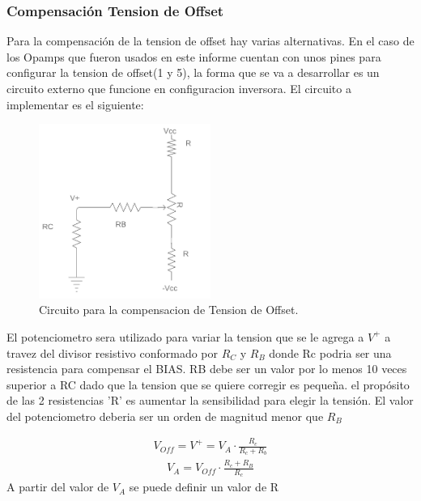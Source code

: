 \subsubsection{Compensación Tension de Offset}
Para la compensación de la tension de offset hay varias alternativas. En el caso de los Opamps que fueron usados en este informe cuentan con unos pines para configurar la tension de offset(1 y 5), la forma que se va a desarrollar es un circuito externo que funcione en configuracion inversora.
El circuito a implementar es el siguiente:
\begin{figure}[H]	
	\centering
	\includegraphics[width=0.5\textwidth]{imagenes/CompensacionOff.PNG}
	\caption{Circuito para la compensacion de Tension de Offset.}
	\label{fig:CompensacionOff}
\end{figure}
El potenciometro sera utilizado para variar la tension que se le agrega a $V^+$ a travez del divisor resistivo conformado por $R_C$ y $R_B$ donde Rc podria ser una resistencia para compensar el BIAS. RB debe ser un valor por lo menos 10 veces superior a RC dado que la tension que se quiere corregir es pequeña. el propósito de las 2 resistencias 'R' es aumentar la sensibilidad para elegir la tensión. El valor del potenciometro deberia ser un orden de magnitud menor que $R_B $

\begin{align}
V_{Off}=V^+ = V_A \cdot \frac{R_c}{R_c+R_b}  
\end{align}
\begin{align}
V_A =V_{Off} \cdot \frac{R_c+R_B}{R_c}
\end{align}
A partir del valor de $V_A$ se puede definir un valor de R
